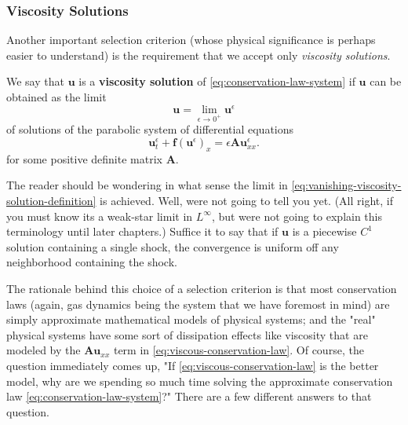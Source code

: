 \subsubsection{Viscosity Solutions}\label{subsec:viscosity-solutions}

Another important selection criterion (whose physical significance is perhaps easier to understand) is the requirement that we accept only \emph{viscosity solutions}.

\begin{Definition}
\label{def:viscosity-solution}
We say that $\bm{u}$ is a \textbf{viscosity solution} of \eqref{eq:conservation-law-system} if $\bm{u}$ can be obtained as the limit
\begin{equation}\label{eq:vanishing-viscosity-solution-definition}
\bm{u}=\lim_{\epsilon\to0^+}\bm{u}^\epsilon
\end{equation}
of solutions of the parabolic system of differential equations
\begin{equation}\label{eq:viscous-conservation-law}
\bm{u}_t^\epsilon+\bm{f}(\bm{u}^\epsilon)_x=\epsilon\bm{A}\bm{u}_{xx}^\epsilon.
\end{equation}
for some positive definite matrix $\bm{A}$.
\end{Definition}

\begin{Remark}
\label{rem:viscosity-limit-sense}
The reader should be wondering in what sense the limit in \eqref{eq:vanishing-viscosity-solution-definition} is achieved. Well, we\textquotesingle re not going to tell you yet. (All right, if you must know it\textquotesingle s a weak-star limit in $L^\infty$, but we\textquotesingle re not going to explain this terminology until later chapters.) Suffice it to say that if $\bm{u}$ is a piecewise $C^1$ solution containing a single shock, the convergence is uniform off any neighborhood containing the shock.
\end{Remark}

The rationale behind this choice of a selection criterion is that most conservation laws (again, gas dynamics being the system that we have foremost in mind) are simply approximate mathematical models of physical systems; and the "real" physical systems have some sort of dissipation effects like viscosity that are modeled by the $\bm{A}\bm{u}_{xx}$ term in \eqref{eq:viscous-conservation-law}. Of course, the question immediately comes up, "If \eqref{eq:viscous-conservation-law} is the better model, why are we spending so much time solving the approximate conservation law \eqref{eq:conservation-law-system}?" There are a few different answers to that question.

